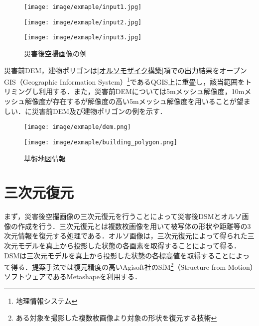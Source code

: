     \begin{figure}[tbp]
      \begin{minipage}[c]{0.329\hsize}
        \centering
        \texttt{[image: image/exmaple/input1.jpg]}
        \label{入力画像例1}
      \end{minipage}
      \begin{minipage}[c]{0.329\hsize}
        \centering
        \texttt{[image: image/exmaple/input2.jpg]}
        \label{入力画像例2}
      \end{minipage}
      \begin{minipage}[c]{0.329\hsize}
        \centering
        \texttt{[image: image/exmaple/input3.jpg]}
        \label{入力画像例3}
      \end{minipage}
      \caption{災害後空撮画像の例}
      \label{空撮画像例}
    \end{figure}

    災害前DEM，建物ポリゴンは\ref{オルソモザイク構築}項での出力結果をオープンGIS（Geographic Information System）\footnote{地理情報システム}であるQGIS\cite{QGIS}上に重畳し，該当範囲をトリミングし利用する．また，災害前DEMについては5mメッシュ解像度，10mメッシュ解像度が存在するが解像度の高い5mメッシュ解像度を用いることが望ましい．に災害前DEM及び建物ポリゴンの例を示す．

    \begin{figure}[tbp]
      \begin{minipage}[c]{0.45\hsize}
        \centering
        \texttt{[image: image/exmaple/dem.png]}
      \end{minipage}
      \begin{minipage}[c]{0.45\hsize}
        \centering
        \texttt{[image: image/exmaple/building\_polygon.png]}
      \end{minipage}
      \caption{基盤地図情報}
      \label{基盤地図情報}
    \end{figure}



  \section{三次元復元}
    まず，災害後空撮画像の三次元復元を行うことによって災害後DSMとオルソ画像の作成を行う．三次元復元とは複数枚画像を用いて被写体の形状や距離等の3次元情報を復元する処理である．オルソ画像は，三次元復元によって得られた三次元モデルを真上から投影した状態の各画素を取得することによって得る．DSMは三次元モデルを真上から投影した状態の各標高値を取得することによって得る．提案手法では復元精度の高いAgisoft社のSfM\footnote{ある対象を撮影した複数枚画像より対象の形状を復元する技術}（Structure from Motion）ソフトウェアであるMetashape\cite{Metashape}を利用する．


